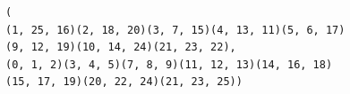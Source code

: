 \begin{verbatim}
(
(1, 25, 16)(2, 18, 20)(3, 7, 15)(4, 13, 11)(5, 6, 17)
(9, 12, 19)(10, 14, 24)(21, 23, 22), 
(0, 1, 2)(3, 4, 5)(7, 8, 9)(11, 12, 13)(14, 16, 18)
(15, 17, 19)(20, 22, 24)(21, 23, 25))
\end{verbatim}
